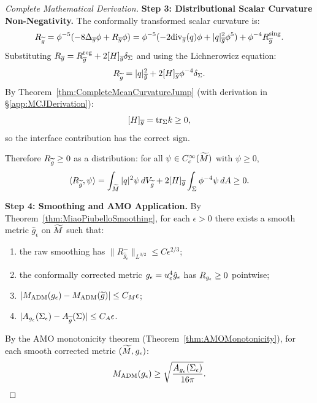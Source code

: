\begin{proof}[Complete Mathematical Derivation]
\textbf{Step 3: Distributional Scalar Curvature Non-Negativity.}
The conformally transformed scalar curvature is:
\begin{equation}\label{eq:ConformalScalarFinal}
    R_{\widetilde{g}} = \phi^{-5}(-8\Delta_{\overline{g}}\phi + R_{\overline{g}}\phi) = \phi^{-5}(-2\mathrm{div}_{\overline{g}}(q)\phi + |q|^2_{\overline{g}}\phi^5) + \phi^{-4}R_{\overline{g}}^{\mathrm{sing}}.
\end{equation}
Substituting $R_{\overline{g}} = R_{\overline{g}}^{\mathrm{reg}} + 2[H]_{\overline{g}}\delta_\Sigma$ and using the Lichnerowicz equation:
\begin{equation}\label{eq:TildeCurvatureFinal}
    R_{\widetilde{g}} = |q|^2_{\overline{g}} + 2[H]_{\overline{g}}\phi^{-4}\delta_\Sigma.
\end{equation}
By Theorem~\ref{thm:CompleteMeanCurvatureJump} (with derivation in \S\ref{app:MCJDerivation}):
\begin{equation}\label{eq:JumpPositiveFinal}
    [H]_{\overline{g}} = \mathrm{tr}_\Sigma k \ge 0,
\end{equation}
so the interface contribution has the correct sign.

Therefore $R_{\widetilde{g}} \ge 0$ as a distribution: for all $\psi \in C^\infty_c(\widetilde{M})$ with $\psi \ge 0$,
\begin{equation}\label{eq:DistrPosFinal}
    \langle R_{\widetilde{g}}, \psi \rangle = \int_{\widetilde{M}} |q|^2 \psi \, dV_{\widetilde{g}} + 2[H]_{\overline{g}} \int_\Sigma \phi^{-4} \psi \, dA \ge 0.
\end{equation}

\textbf{Step 4: Smoothing and AMO Application.}
By Theorem~\ref{thm:MiaoPiubelloSmoothing}, for each $\epsilon > 0$ there exists a smooth metric $\hat{g}_\epsilon$ on $\widetilde{M}$ such that:
\begin{enumerate}
    \item the raw smoothing has $\|R^-_{\hat{g}_\epsilon}\|_{L^{3/2}}\le C\epsilon^{2/3}$;
    \item the conformally corrected metric $g_{\epsilon}=u_\epsilon^4\hat{g}_\epsilon$ has $R_{g_{\epsilon}} \ge 0$ pointwise;
    \item $|M_{\mathrm{ADM}}(g_{\epsilon}) - M_{\mathrm{ADM}}(\widetilde{g})| \le C_M \epsilon$;
    \item $|A_{g_{\epsilon}}(\Sigma_\epsilon) - A_{\widetilde{g}}(\Sigma)| \le C_A \epsilon$.
\end{enumerate}

By the AMO monotonicity theorem (Theorem~\ref{thm:AMOMonotonicity}), for each smooth corrected metric $(\widetilde{M}, g_{\epsilon})$:
\begin{equation}\label{eq:AMOAppliedFinal}
    M_{\mathrm{ADM}}(g_{\epsilon}) \ge \sqrt{\frac{A_{g_{\epsilon}}(\Sigma_\epsilon)}{16\pi}}.
\end{equation}


\end{proof}
